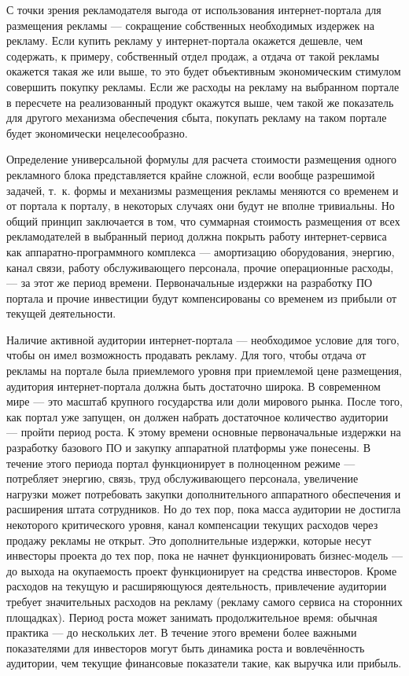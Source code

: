 \documentclass{article}
\begin{document}
С точки зрения рекламодателя выгода от использования интернет-портала для размещения рекламы — сокращение собственных необходимых издержек на рекламу. Если купить рекламу у интернет-портала окажется дешевле, чем содержать, к примеру, собственный отдел продаж, а отдача от такой рекламы окажется такая же или выше, то это будет объективным экономическим стимулом совершить покупку рекламы. Если же расходы на рекламу на выбранном портале в пересчете на реализованный продукт окажутся выше, чем такой же показатель для другого механизма обеспечения сбыта, покупать рекламу на таком портале будет экономически нецелесообразно.

Определение универсальной формулы для расчета стоимости размещения одного рекламного блока представляется крайне сложной, если вообще разрешимой задачей, т.~к. формы и механизмы размещения рекламы меняются со временем и от портала к порталу, в некоторых случаях они будут не вполне тривиальны. Но общий принцип заключается в том, что суммарная стоимость размещения от всех рекламодателей в выбранный период должна покрыть работу интернет-сервиса как аппаратно-программного комплекса — амортизацию оборудования, энергию, канал связи, работу обслуживающего персонала, прочие операционные расходы, — за этот же период времени. Первоначальные издержки на разработку ПО портала и прочие инвестиции будут компенсированы со временем из прибыли от текущей деятельности.

Наличие активной аудитории интернет-портала — необходимое условие для того, чтобы он имел возможность продавать рекламу. Для того, чтобы отдача от рекламы на портале была приемлемого уровня при приемлемой цене размещения, аудитория интернет-портала должна быть достаточно широка. В современном мире — это масштаб крупного государства или доли мирового рынка. После того, как портал уже запущен, он должен набрать достаточное количество аудитории — пройти период роста. К этому времени основные первоначальные издержки на разработку базового ПО и закупку аппаратной платформы уже понесены. В течение этого периода портал функционирует в полноценном режиме — потребляет энергию, связь, труд обслуживающего персонала, увеличение нагрузки может потребовать закупки дополнительного аппаратного обеспечения и расширения штата сотрудников. Но до тех пор, пока масса аудитории не достигла некоторого критического уровня, канал компенсации текущих расходов через продажу рекламы не открыт. Это дополнительные издержки, которые несут инвесторы проекта до тех пор, пока не начнет функционировать бизнес-модель — до выхода на окупаемость проект функционирует на средства инвесторов. Кроме расходов на текущую и расширяющуюся деятельность, привлечение аудитории требует значительных расходов на рекламу (рекламу самого сервиса на сторонних площадках). Период роста может занимать продолжительное время: обычная практика — до нескольких лет. В течение этого времени более важными показателями для инвесторов могут быть динамика роста и вовлечённость аудитории, чем текущие финансовые показатели такие, как выручка или прибыль.
\end{document}
